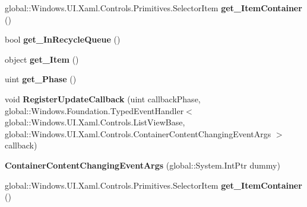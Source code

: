 \begin{DoxyCompactItemize}
global\+::\+Windows.\+U\+I.\+Xaml.\+Controls.\+Primitives.\+Selector\+Item {\bfseries get\+\_\+\+Item\+Container} ()
\item 
\mbox{\label{class_windows_1_1_u_i_1_1_xaml_1_1_controls_1_1_container_content_changing_event_args_aa88d1a956dccd408c22cd68822cbf018}} 
bool {\bfseries get\+\_\+\+In\+Recycle\+Queue} ()
\item 
\mbox{\label{class_windows_1_1_u_i_1_1_xaml_1_1_controls_1_1_container_content_changing_event_args_adf6a56892a3645903bdbeb798faa1e67}} 
object {\bfseries get\+\_\+\+Item} ()
\item 
\mbox{\label{class_windows_1_1_u_i_1_1_xaml_1_1_controls_1_1_container_content_changing_event_args_a83b5777887886032cce986dfbafd12ac}} 
uint {\bfseries get\+\_\+\+Phase} ()
\item 
\mbox{\label{class_windows_1_1_u_i_1_1_xaml_1_1_controls_1_1_container_content_changing_event_args_af9bbdca8851131ee69d2767595d51531}} 
void {\bfseries Register\+Update\+Callback} (uint callback\+Phase, global\+::\+Windows.\+Foundation.\+Typed\+Event\+Handler$<$ global\+::\+Windows.\+U\+I.\+Xaml.\+Controls.\+List\+View\+Base, global\+::\+Windows.\+U\+I.\+Xaml.\+Controls.\+Container\+Content\+Changing\+Event\+Args $>$ callback)
\item 
\mbox{\label{class_windows_1_1_u_i_1_1_xaml_1_1_controls_1_1_container_content_changing_event_args_a04e2ae3d4530956b6f2478107d6aca2a}} 
{\bfseries Container\+Content\+Changing\+Event\+Args} (global\+::\+System.\+Int\+Ptr dummy)
\item 
\mbox{\label{class_windows_1_1_u_i_1_1_xaml_1_1_controls_1_1_container_content_changing_event_args_a5fc601b8ea34400cac39f7c694925574}} 
global\+::\+Windows.\+U\+I.\+Xaml.\+Controls.\+Primitives.\+Selector\+Item {\bfseries get\+\_\+\+Item\+Container} ()

\end{DoxyCompactItemize}
